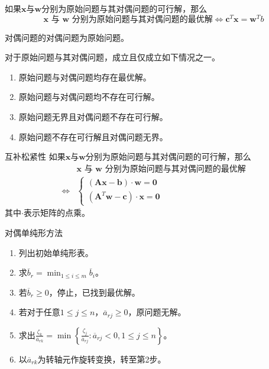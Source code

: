 \documentclass[lang = cn, scheme = chinese, thmcnt = section]{elegantbook}
\newcommand{\bs}{\boldsymbol}          %
\begin{document}
\begin{corollary}
	如果$\bs{x}$与$\bs{w}$分别为原始问题与其对偶问题的可行解，那么
	$$
	\bs{x}\text{ 与 }\bs{w}\text{ 分别为原始问题与其对偶问题的最优解}
	\iff
	\bs{c}^T\bs{x}=\bs{w}^Tb
	$$
\end{corollary}

\begin{theorem}
	对偶问题的对偶问题为原始问题。
\end{theorem}

\begin{theorem}
	对于原始问题与其对偶问题，成立且仅成立如下情况之一。
	\begin{enumerate}
		\item 原始问题与对偶问题均存在最优解。
		\item 原始问题与对偶问题均不存在可行解。
		\item 原始问题无界且对偶问题不存在可行解。
		\item 原始问题不存在可行解且对偶问题无界。
	\end{enumerate}
\end{theorem}

\begin{theorem}{互补松紧性}
	如果$\bs{x}$与$\bs{w}$分别为原始问题与其对偶问题的可行解，那么
	\begin{align*}
		& \bs{x}\text{ 与 }\bs{w}\text{ 分别为原始问题与其对偶问题的最优解}\\
		\iff & 
		\begin{cases}
			(\bs{Ax}-\bs{b})\cdot \bs{w}=\bs{0}\\
			(\bs{A}^T\bs{w}-\bs{c})\cdot \bs{x}=\bs{0}
		\end{cases}
	\end{align*}
	其中$\cdot$表示矩阵的点乘。
\end{theorem}

\begin{theorem}{对偶单纯形方法}
	\begin{enumerate}
		\item 列出初始单纯形表。
		\item 求$\displaystyle \overline{b}_r=\min_{1\le i \le m}\overline{b}_i$。
		\item 若$\overline{b}_r\ge 0$，停止，已找到最优解。
		\item 若对于任意$1\le j \le n$，$\overline{a}_{rj}\ge 0$，原问题无解。
		\item 求出$\displaystyle \frac{\zeta_k}{\overline{a}_{rk}}=\min\left\{ \frac{\zeta_j}{\overline{a}_{rj}}:\overline{a}_{rj}<0,1\le j \le n \right\}$。
		\item 以$\overline{a}_{rk}$为转轴元作旋转变换，转至第2步。
	\end{enumerate}
\end{theorem}
\end{document}
